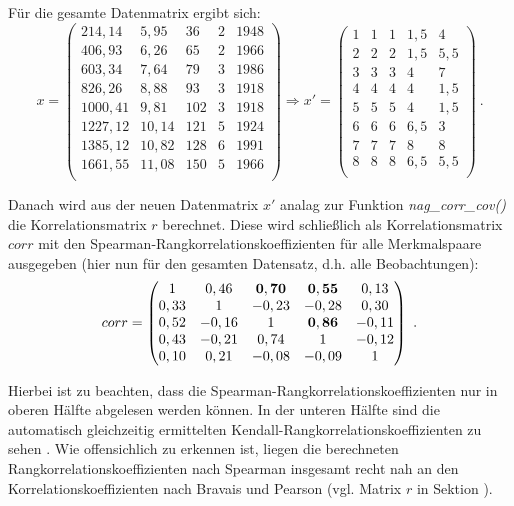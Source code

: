 \noindent Für die gesamte Datenmatrix ergibt sich:
\begin{equation*}
	x =
	\begin{pmatrix}
		214,14 & 5,95 & 36 & 2 & 1948\\
		406,93 & 6,26 & 65 & 2 & 1966\\
		603,34 & 7,64 & 79 & 3 & 1986\\
		826,26 & 8,88 & 93 & 3 & 1918\\
		1000,41 & 9,81 & 102 & 3 & 1918\\
		1227,12 & 10,14 & 121 & 5 & 1924\\
		1385,12 & 10,82 & 128 & 6 & 1991\\
		1661,55 & 11,08 & 150 & 5 & 1966\\
	\end{pmatrix}
	\Rightarrow
	x' =
	\begin{pmatrix}
		1 & 1 & 1 & 1,5 & 4\\
		2 & 2 & 2 & 1,5 & 5,5\\
		3 & 3 & 3 & 4 & 7\\
		4 & 4 & 4 & 4 & 1,5\\
		5 & 5 & 5 & 4 & 1,5\\
		6 & 6 & 6 & 6,5 & 3\\
		7 & 7 & 7 & 8 & 8\\
		8 & 8 & 8 & 6,5 & 5,5\\
	\end{pmatrix} ~.
\end{equation*}

\noindent Danach wird aus der neuen Datenmatrix $x'$ analag zur Funktion {\it nag\_corr\_cov()} die Korrelationsmatrix $r$ berechnet. Diese wird schließlich als Korrelationsmatrix $corr$ mit den Spearman-Rangkorrelationskoeffizienten für alle Merkmalspaare ausgegeben (hier nun für den gesamten Datensatz, d.h. alle Beobachtungen):
\begin{equation*}
	corr =
	\begin{pmatrix}
		1 & 0,46 & {\bf 0,70} & {\bf 0,55} & 0,13\\
		0,33 & 1 & -0,23 & -0,28 & 0,30\\
		0,52 & -0,16 & 1 & {\bf 0,86} & -0,11\\
		0,43 & -0,21 & 0,74 & 1 & -0,12\\
		0,10 & 0,21 & -0,08 & -0,09 & 1\\
	\end{pmatrix} ~.
\end{equation*}

\noindent Hierbei ist zu beachten, dass die Spearman-Rangkorrelationskoeffizienten nur in oberen Hälfte abgelesen werden können. In der unteren Hälfte sind die automatisch gleichzeitig ermittelten Kendall-Rangkorrelationskoeffizienten zu sehen \cite[S. 2-3]{nag:g02brc}. Wie offensichlich zu erkennen ist, liegen die berechneten Rangkorrelationskoeffizienten nach Spearman insgesamt recht nah an den Korrelationskoeffizienten nach Bravais und Pearson (vgl. Matrix $r$ in Sektion ).

